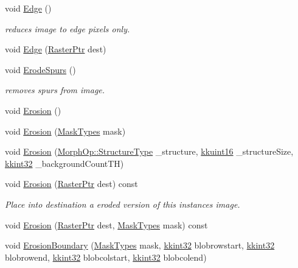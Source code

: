 \begin{DoxyCompactItemize}
void \hyperlink{class_k_k_b_1_1_raster_a02fe968acb47d8f7654c115041598c8a}{Edge} ()
\begin{DoxyCompactList}\small\item\em reduces image to edge pixels only. \end{DoxyCompactList}\item 
void \hyperlink{class_k_k_b_1_1_raster_a8d1b7f8485f2634b6d8c8499d63b7453}{Edge} (\hyperlink{class_k_k_b_1_1_raster_aefa532857fd6aa9eb53f79da55a97c5a}{Raster\+Ptr} dest)
\item 
void \hyperlink{class_k_k_b_1_1_raster_a282cb542ba0069ee5da5c82913390f46}{Erode\+Spurs} ()
\begin{DoxyCompactList}\small\item\em removes spurs from image. \end{DoxyCompactList}\item 
void \hyperlink{class_k_k_b_1_1_raster_a5a019718e60c06c4262e8127232ff19c}{Erosion} ()
\item 
void \hyperlink{class_k_k_b_1_1_raster_acb9279f22fd4af75dd91360474528cff}{Erosion} (\hyperlink{class_k_k_b_1_1_morph_op_a9eaa0383bf9e046da208af397e7e35eb}{Mask\+Types} mask)
\item 
void \hyperlink{class_k_k_b_1_1_raster_aad2335f0f5c873c70374d0ff0cd05775}{Erosion} (\hyperlink{class_k_k_b_1_1_morph_op_a09e4aff7e81327849855ff72082d85b3}{Morph\+Op\+::\+Structure\+Type} \+\_\+structure, \hyperlink{namespace_k_k_b_aa8c7d4d30381c8a0b6fce68974a9c8a9}{kkuint16} \+\_\+structure\+Size, \hyperlink{namespace_k_k_b_a8fa4952cc84fda1de4bec1fbdd8d5b1b}{kkint32} \+\_\+background\+Count\+TH)
\item 
void \hyperlink{class_k_k_b_1_1_raster_a390aeef1c03a10740baec6e3fb7736c0}{Erosion} (\hyperlink{class_k_k_b_1_1_raster_aefa532857fd6aa9eb53f79da55a97c5a}{Raster\+Ptr} dest) const 
\begin{DoxyCompactList}\small\item\em Place into destination a eroded version of this instances image. \end{DoxyCompactList}\item 
void \hyperlink{class_k_k_b_1_1_raster_ac426d284da43e060747bac5635d8cb4b}{Erosion} (\hyperlink{class_k_k_b_1_1_raster_aefa532857fd6aa9eb53f79da55a97c5a}{Raster\+Ptr} dest, \hyperlink{class_k_k_b_1_1_morph_op_a9eaa0383bf9e046da208af397e7e35eb}{Mask\+Types} mask) const 
\item 
void \hyperlink{class_k_k_b_1_1_raster_a854cc80ed1c095771599d0638856a962}{Erosion\+Boundary} (\hyperlink{class_k_k_b_1_1_morph_op_a9eaa0383bf9e046da208af397e7e35eb}{Mask\+Types} mask, \hyperlink{namespace_k_k_b_a8fa4952cc84fda1de4bec1fbdd8d5b1b}{kkint32} blobrowstart, \hyperlink{namespace_k_k_b_a8fa4952cc84fda1de4bec1fbdd8d5b1b}{kkint32} blobrowend, \hyperlink{namespace_k_k_b_a8fa4952cc84fda1de4bec1fbdd8d5b1b}{kkint32} blobcolstart, \hyperlink{namespace_k_k_b_a8fa4952cc84fda1de4bec1fbdd8d5b1b}{kkint32} blobcolend)

\end{DoxyCompactItemize}
